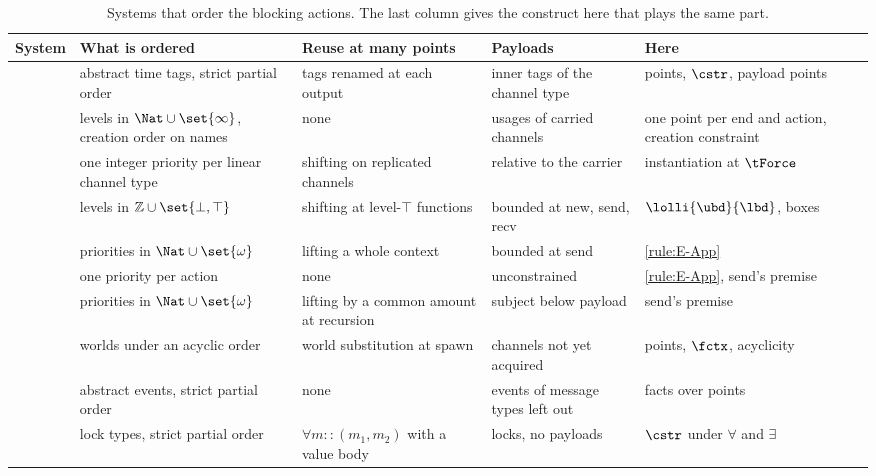 \begin{table}[tp]
  \caption{Systems that order the blocking actions. The last column
    gives the construct here that plays the same part.}
  \label{tab:related}
  \small
  \begin{tabular}{p{}p{}p{}p{}p{}}
    \toprule
    System & What is ordered & Reuse at many points & Payloads & Here \\
    \midrule
    \citet{Kobayashi97}
      & abstract time tags, strict partial order
      & tags renamed at each output
      & inner tags of the channel type
      & points, $\cstr$, payload points \\
    \citet{Kobayashi06}
      & levels in $\Nat \cup \set{\infty}$, creation order on names
      & none
      & usages of carried channels
      & one point per end and action, creation constraint \\
    \citet{Padovani14}
      & one integer priority per linear channel type
      & shifting on replicated channels
      & relative to the carrier
      & instantiation at $\tForce$ \\
    \citet{PadovaniN15}
      & levels in $\mathbb{Z} \cup \set{\bot,\top}$
      & shifting at level-$\top$ functions
      & bounded at new, send, recv
      & $\lolli{\ubd}{\lbd}$, boxes \\
    \citet{DardhaG18}
      & priorities in $\Nat \cup \set{\omega}$
      & lifting a whole context
      & bounded at send
      & \ref{rule:E-App} \\
    \citet{KokkeD23}
      & one priority per action
      & none
      & unconstrained
      & \ref{rule:E-App}, send's premise \\
    \citet{APCP}
      & priorities in $\Nat \cup \set{\omega}$
      & lifting by a common amount at recursion
      & subject below payload
      & send's premise \\
    \citet{BalzerTP19}
      & worlds under an acyclic order
      & world substitution at spawn
      & channels not yet acquired
      & points, $\fctx$, acyclicity \\
    \citet{VieiraV13}
      & abstract events, strict partial order
      & none
      & events of message types left out
      & facts over points \\
    \citet{FlanaganA99}
      & lock types, strict partial order
      & $\forall m :: (m_1,m_2)$ with a value body
      & locks, no payloads
      & $\cstr$ under $\forall$ and $\exists$ \\
    \bottomrule
  \end{tabular}
\end{table}

